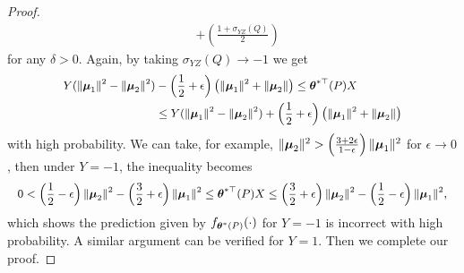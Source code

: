 \begin{proof}
\begin{equation}
\begin{aligned}
		& + \left(\frac{1 + \sigma_{YZ}(Q)}{2}\right)
		\end{aligned}
	\end{equation}
	for any $\delta > 0$. Again, by taking $\sigma_{YZ}(Q)\to -1$ we get 
	\begin{equation}
		\small
		\begin{aligned}
		Y(\|\bmu_{1}\|^{2} - \|\bmu_{2}\|^{2}) & - \left(\frac{1}{2} + \epsilon\right)\left(\|\bmu_{1}\|^{2} + \|\bmu_{2}\|\right) \leq \btheta^{*\top}(P)X \\
		& \leq Y(\|\bmu_{1}\|^{2} - \|\bmu_{2}\|^{2}) + \left(\frac{1}{2} + \epsilon\right)\left(\|\bmu_{1}\|^{2} + \|\bmu_{2}\|\right)
		\end{aligned}
	\end{equation}
	with high probability. We can take, for example, $\|\text{\boldmath{$\mu$}}_{2}\|^{2} > \left(\frac{3 + 2\epsilon}{1 - \epsilon}\right)\|\text{\boldmath{$\mu$}}_{1}\|^{2}$ for $\epsilon\to0$, then under $Y = -1$, the inequality becomes 
	\begin{equation}
		\small
		0 < \left(\frac{1}{2} - \epsilon\right)\|\bmu_{2}\|^{2} - \left(\frac{3}{2} + \epsilon\right)\|\bmu_{1}\|^{2} \leq \btheta^{*\top}(P)X \leq \left(\frac{3}{2} + \epsilon\right)\|\bmu_{2}\|^{2} - \left(\frac{1}{2} - \epsilon\right)\|\bmu_{1}\|^{2} ,
	\end{equation}
	which shows the prediction given by $f_{\text{\boldmath{$\theta$}}^{*}(P)}(\cdot)$ for $Y = -1$ is incorrect with high probability. A similar argument can be verified for $Y = 1$. Then we complete our proof. 
\end{proof}
\thminvariantmodel*
